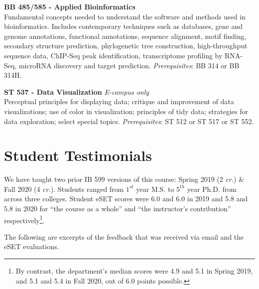 \documentclass[10pt]{article}
\begin{document}
\vspace{1pc}
\noindent
\textbf{BB 485/585 - Applied Bioinformatics}\\
Fundamental concepts needed to understand the software and methods used in bioinformatics. Includes 
contemporary techniques such as databases, gene and genome annotations, functional annotations, 
sequence alignment, motif finding, secondary structure prediction, phylogenetic tree construction, 
high-throughput sequence data, ChIP-Seq peak identification, transcriptome profiling by RNA-Seq, 
microRNA discovery and target prediction.  \emph{Prerequisites}: BB 314 or BB 314H.

\vspace{1pc}
\noindent
\textbf{ST 537 - Data Visualization} \emph{E-campus only}\\
Perceptual principles for displaying data; critique and improvement of data visualizations; use of color in 
visualization; principles of tidy data; strategies for data exploration; select special topics. 
\emph{Prerequisites}: ST 512 or ST 517 or ST 552.


\clearpage

\section*{Student Testimonials}
We have taught two prior IB 599 versions of this course: Spring 2019 (2 \emph{cr.}) \& Fall 2020 (4 
\emph{cr.}).
Students ranged from $1^{st}$ year M.S. to $5^{th}$ year Ph.D. from across three colleges. 
Student eSET scores were 6.0 and 6.0 in 2019 and 5.8 and 5.8 in 2020 for ``the course as a whole'' and 
``the instructor's contribution'' respectively\footnote{By contrast, the department's median scores were 
4.9 and 5.1 in Spring 2019, and 5.1 and 5.4 in Fall 2020, out of 6.0 points possible.}.


The following are excerpts of the feedback that was received via email and the eSET evaluations.
\end{document}
